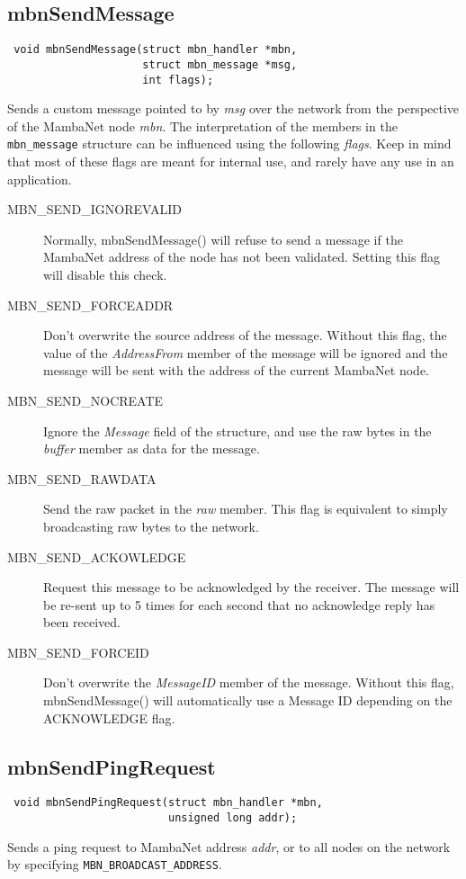 \documentclass[a4paper]{report}
\begin{document}
\subsection{mbnSendMessage}
\begin{verbatim}
 void mbnSendMessage(struct mbn_handler *mbn,
                     struct mbn_message *msg,
                     int flags);
\end{verbatim}
Sends a custom message pointed to by \textit{msg} over the network from the perspective of the MambaNet node \textit{mbn}. The interpretation of the members in the \verb|mbn_message| structure can be influenced using the following \textit{flags}. Keep in mind that most of these flags are meant for internal use, and rarely have any use in an application.
\begin{description}
  \item[MBN\_SEND\_IGNOREVALID]
   Normally, mbnSendMessage() will refuse to send a message if the MambaNet address of the node has not been validated. Setting this flag will disable this check.
  \item[MBN\_SEND\_FORCEADDR]
   Don't overwrite the source address of the message. Without this flag, the value of the \textit{AddressFrom} member of the message will be ignored and the message will be sent with the address of the current MambaNet node.
  \item[MBN\_SEND\_NOCREATE]
   Ignore the \textit{Message} field of the structure, and use the raw bytes in the \textit{buffer} member as data for the message.
  \item[MBN\_SEND\_RAWDATA]
   Send the raw packet in the \textit{raw} member. This flag is equivalent to simply broadcasting raw bytes to the network.
  \item[MBN\_SEND\_ACKOWLEDGE]
   Request this message to be acknowledged by the receiver. The message will be re-sent up to 5 times for each second that no acknowledge reply has been received.
  \item[MBN\_SEND\_FORCEID]
   Don't overwrite the \textit{MessageID} member of the message. Without this flag, mbnSendMessage() will automatically use a Message ID depending on the ACKNOWLEDGE flag.
\end{description}


\subsection{mbnSendPingRequest}
\begin{verbatim}
 void mbnSendPingRequest(struct mbn_handler *mbn,
                         unsigned long addr);
\end{verbatim}
Sends a ping request to MambaNet address \textit{addr}, or to all nodes on the network by specifying \verb|MBN_BROADCAST_ADDRESS|.
\end{document}
